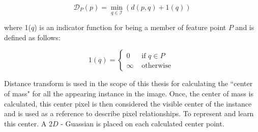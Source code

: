 \begin{equation}\mathcal{D}_{P}(p)=\min _{q \in \mathcal{I}}(d(p, q)+1(q))\end{equation}

where 1($q$) is an indicator function for being a member of feature point $P$ and is defined as follows: 

\begin{equation}1(q)=\left\{\begin{array}{ll}
0 & \text { if } q \in P \\
\infty & \text { otherwise }
\end{array}\right.\end{equation}


Distance transform is used in the scope of this thesis for calculating the ``center of mass" for all the appearing instance in the image. Once, the center of mass is calculated, this center pixel is then considered the visible center of the instance and is used as a reference to describe pixel relationships. To represent and learn this center. A $2D$ - Guassian is placed on each calculated center point.

